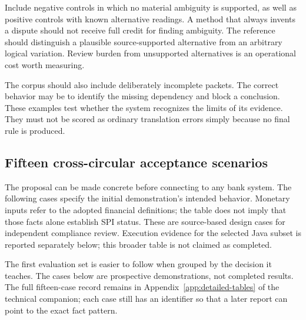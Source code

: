 \documentclass[12pt,a4paper,oneside,openany]{book}
\begin{document}
Include negative controls in which no material ambiguity is supported, as well
as positive controls with known alternative readings. A method that always
invents a dispute should not receive full credit for finding ambiguity. The
reference should distinguish a plausible source-supported alternative from an
arbitrary logical variation. Review burden from unsupported alternatives is an
operational cost worth measuring.

The corpus should also include deliberately incomplete packets. The correct
behavior may be to identify the missing dependency and block a conclusion. These
examples test whether the system recognizes the limits of its evidence. They
must not be scored as ordinary translation errors simply because no final rule
is produced.

\subsection{Fifteen cross-circular acceptance scenarios}
\label{merge:P-05-evidence:00}

\label{sec:evidence}

The proposal can be made concrete before connecting to any bank system. The
following cases specify the initial demonstration's intended behavior. Monetary
inputs refer to the adopted financial definitions; the table does not imply that
those facts alone establish SPI status. These are source-based design cases for
independent compliance review. Execution evidence for the selected Java subset
is reported separately below; this broader table is not claimed as completed.

The first evaluation set is easier to follow when grouped by the decision it
teaches. The cases below are prospective demonstrations, not completed results.
The full fifteen-case record remains in Appendix~\ref{app:detailed-tables} of the technical companion; each
case still has an identifier so that a later report can point to the exact fact
pattern.
\end{document}
